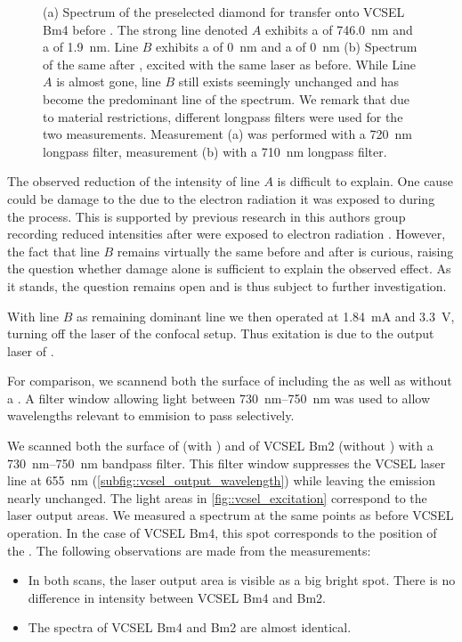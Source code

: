 \begin{figure}[htp]
\begin{subfigure}[t]{ 0.49\linewidth}
			\caption{}
			\label{subfig::spectrum_vcsel_confocal_excitation_with_diamond}
		\end{subfigure}
		\caption[\Siv properties before and after \pp]{(a) Spectrum of the preselected diamond for transfer onto VCSEL Bm4 before \pp. The strong line denoted $A$ exhibits a \cwl of \SI{746.0}{nm} and a \lw of \SI{1.9}{nm}. Line $B$ exhibits a \cwl of \SI{0}{nm} and a \lw of \SI{0}{nm}  (b) Spectrum of the same \siv after \pp, excited with the same laser as before. While Line $A$ is almost gone, line $B$ still exists seemingly unchanged and has become the predominant line of the spectrum. We remark that due to material restrictions, different longpass filters were used for the two measurements. Measurement (a) was performed with a \SI{720}{nm} longpass filter, measurement (b) with a \SI{710}{nm} longpass filter.}
		\label{fig::spectrum_vcsel_diamond}
	\end{figure}

	The observed reduction of the intensity of line $A$ is difficult to explain. One cause could be damage to the \cc due to the electron radiation it was exposed to during the \pp process. This is supported by previous research in this authors group recording reduced \fl intensities after \ccs were exposed to electron radiation \cite{alexmeyer::baccthesis}. However, the fact that line $B$ remains virtually the same before and after \pp is curious, raising the question whether damage alone is sufficient to explain the observed effect. As it stands, the question remains open and is thus subject to further investigation.

	With line $B$ as remaining dominant line we then operated \BmFour at \SI{1.84}{mA} and \SI{3.3}{V}, turning off the laser of the confocal setup.
	Thus \siv exitation is due to the output laser of \BmFour.

	For comparison, we scannend both the surface of \BmFour including the \nd as well as \BmTwo without a \nd. A filter window allowing light between \SIrange{730}{750}{\nm} was used to allow wavelengths relevant to \siv emmision to pass selectively.


	We scanned both the surface of  (with \nd) and of VCSEL Bm2 (without \nd) with a \SIrange{730}{750}{nm} bandpass filter.
	This filter window suppresses the VCSEL laser line at \SI{655}{nm} (\ref{subfig::vcsel_output_wavelength}) while leaving the \siv emission nearly unchanged.
	The light areas in \cref{fig::vcsel_excitation} correspond to the laser output areas.
	We measured a spectrum at the same points as before VCSEL operation.
	In the case of VCSEL Bm4, this spot corresponds to the position of the \siv.
	The following observations are made from the measurements:
	\begin{itemize}
		\item In both scans, the laser output area is visible as a big bright spot. There is no difference in intensity between VCSEL Bm4 and Bm2.
		\item The spectra of VCSEL Bm4 and Bm2 are almost identical.
	\end{itemize}


